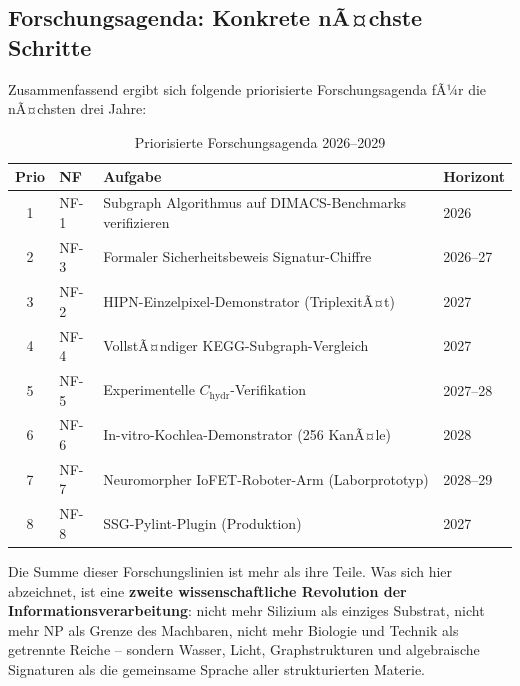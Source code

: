 ﻿\documentclass[a4paper,12pt]{scrreprt}
\theoremstyle{definition}
\begin{document}
\subsection{Forschungsagenda: Konkrete nÃ¤chste Schritte}

Zusammenfassend ergibt sich folgende priorisierte Forschungsagenda
fÃ¼r die nÃ¤chsten drei Jahre:

\begin{table}[H]
\centering
\small
\caption{Priorisierte Forschungsagenda 2026--2029}
\label{tab:agenda}
\begin{tabular}{clp{6cm}l}
\toprule
\textbf{Prio} & \textbf{NF} & \textbf{Aufgabe} & \textbf{Horizont} \\
\midrule
1 & NF-1 & Subgraph Algorithmus auf DIMACS-Benchmarks verifizieren & 2026 \\
2 & NF-3 & Formaler Sicherheitsbeweis Signatur-Chiffre & 2026--27 \\
3 & NF-2 & HIPN-Einzelpixel-Demonstrator (TriplexitÃ¤t) & 2027 \\
4 & NF-4 & VollstÃ¤ndiger KEGG-Subgraph-Vergleich & 2027 \\
5 & NF-5 & Experimentelle $C_\mathrm{hydr}$-Verifikation & 2027--28 \\
6 & NF-6 & In-vitro-Kochlea-Demonstrator (256 KanÃ¤le) & 2028 \\
7 & NF-7 & Neuromorpher IoFET-Roboter-Arm (Laborprototyp) & 2028--29 \\
8 & NF-8 & SSG-Pylint-Plugin (Produktion) & 2027 \\
\bottomrule
\end{tabular}
\end{table}

\bigskip
\noindent
Die Summe dieser Forschungslinien ist mehr als ihre Teile. Was sich
hier abzeichnet, ist eine \textbf{zweite wissenschaftliche Revolution
der Informationsverarbeitung}: nicht mehr Silizium als einziges
Substrat, nicht mehr NP als Grenze des Machbaren, nicht mehr
Biologie und Technik als getrennte Reiche -- sondern
Wasser, Licht, Graphstrukturen und algebraische Signaturen als
die gemeinsame Sprache aller
strukturierten Materie.
\end{document}
